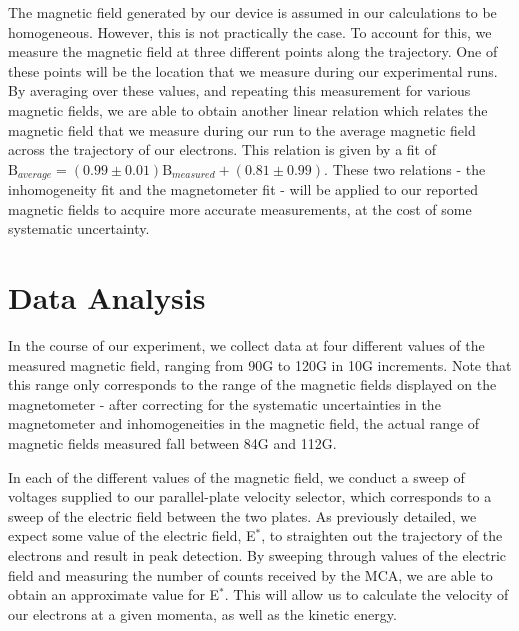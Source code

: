 The magnetic field generated by our device is assumed in our calculations to be homogeneous. However, this is not practically the case. To account for this, we measure the magnetic field at three different points along the trajectory. One of these points will be the location that we measure during our experimental runs. By averaging over these values, and repeating this measurement for various magnetic fields, we are able to obtain another linear relation which relates the magnetic field that we measure during our run to the average magnetic field across the trajectory of our electrons. This relation is given by a fit of $\text{B}_{average} = (0.99 \pm 0.01) \text{B}_{measured} + (0.81 \pm 0.99)$. These two relations - the inhomogeneity fit and the magnetometer fit - will be applied to our reported magnetic fields to acquire more accurate measurements, at the cost of some systematic uncertainty.
\section{Data Analysis}
In the course of our experiment, we collect data at four different values of the measured magnetic field, ranging from 90G to 120G in 10G increments. Note that this range only corresponds to the range of the magnetic fields displayed on the magnetometer - after correcting for the systematic uncertainties in the magnetometer and inhomogeneities in the magnetic field, the actual range of magnetic fields measured fall between 84G and 112G.

In each of the different values of the magnetic field, we conduct a sweep of voltages supplied to our parallel-plate velocity selector, which corresponds to a sweep of the electric field between the two plates. As previously detailed, we expect some value of the electric field, E$^*$,  to straighten out the trajectory of the electrons and result in peak detection. By sweeping through values of the electric field and measuring the number of counts received by the MCA, we are able to obtain an approximate value for E$^*$. This will allow us to calculate the velocity of our electrons at a given momenta, as well as the kinetic energy.

